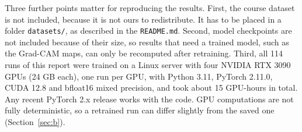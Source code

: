 \documentclass[11pt,a4paper]{article}
\begin{document}
Three further points matter for reproducing the results. First, the course dataset is not included, because it is not ours to redistribute. It has to be placed in a folder \texttt{datasets/}, as described in the \texttt{README.md}. Second, model checkpoints are not included because of their size, so results that need a trained model, such as the Grad-CAM maps, can only be recomputed after retraining. Third, all 114 runs of this report were trained on a Linux server with four NVIDIA RTX 3090 GPUs (24 GB each), one run per GPU, with Python 3.11, PyTorch 2.11.0, CUDA 12.8 and bfloat16 mixed precision, and took about 15 GPU-hours in total. Any recent PyTorch 2.x release works with the code. GPU computations are not fully deterministic, so a retrained run can differ slightly from the saved one (Section~\ref{sec:b}).
\end{document}
